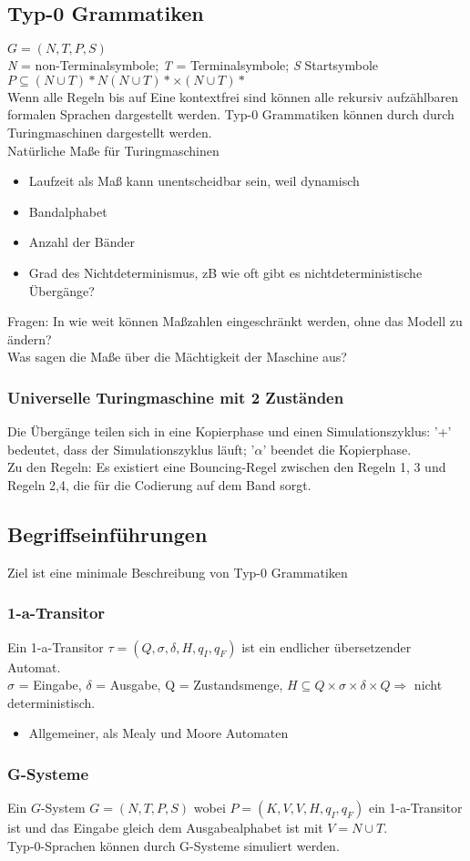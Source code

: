 \documentclass[ngerman]{scrartcl}
\begin{document}
\subsection{Typ-0 Grammatiken}
$G = (N,T,P,S)$\\
\textit{N} = non-Terminalsymbole; \textit{T} = Terminalsymbole; \textit{S} Startsymbole \\
$P \subseteq (N \cup T)* N (N \cup T)* \times (N \cup T)*$\\
Wenn alle Regeln bis auf Eine kontextfrei sind können alle rekursiv aufzählbaren formalen Sprachen dargestellt werden.
Typ-0 Grammatiken können durch durch Turingmaschinen dargestellt werden.\\
Natürliche Maße für Turingmaschinen
\begin{itemize}
\item Laufzeit als Maß kann unentscheidbar sein, weil dynamisch
\item Bandalphabet
\item Anzahl der Bänder
\item Grad des Nichtdeterminismus, zB wie oft gibt es nichtdeterministische Übergänge?
\end{itemize}
Fragen: In wie weit können Maßzahlen eingeschränkt werden, ohne das Modell zu ändern?\\
Was sagen die Maße über die Mächtigkeit der Maschine aus?
\subsubsection{Universelle Turingmaschine mit 2 Zuständen}
Die Übergänge teilen sich in eine Kopierphase und einen Simulationszyklus: '+' bedeutet, dass der Simulationszyklus läuft; '$\alpha$' beendet die Kopierphase.\\
Zu den Regeln: Es existiert eine Bouncing-Regel zwischen den Regeln 1, 3 und Regeln 2,4, die für die Codierung auf dem Band sorgt.
\subsection{Begriffseinführungen}
Ziel ist eine minimale Beschreibung von Typ-0 Grammatiken
\subsubsection{1-a-Transitor}
Ein 1-a-Transitor $\tau = (Q, \sigma, \delta, H, q_{I}, q_{F})$ ist ein endlicher übersetzender Automat.\\
$\sigma$ = Eingabe, $\delta$ = Ausgabe, Q = Zustandsmenge, $H \subseteq Q \times \sigma \times \delta \times Q \Rightarrow$ nicht deterministisch.
\begin{itemize}
\item Allgemeiner, als Mealy und Moore Automaten
\end{itemize}

\subsubsection{G-Systeme}
Ein $G$-System $G = (N,T,P,S)$ wobei $P = (K,V,V,H,q_{I}, q_{F})$ ein 1-a-Transitor ist und das Eingabe gleich dem Ausgabealphabet ist mit $V=N\cup T$.\\
Typ-0-Sprachen können durch G-Systeme simuliert werden.
\end{document}
